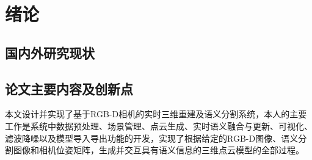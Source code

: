 
\chapter{绪论}



\section{国内外研究现状}






\section{论文主要内容及创新点}


\par 本文设计并实现了基于RGB-D相机的实时三维重建及语义分割系统，本人的主要工作是系统中数据预处理、场景管理、点云生成、实时语义融合与更新、可视化、滤波降噪以及模型导入导出功能的开发，实现了根据给定的RGB-D图像、语义分割图像和相机位姿矩阵，生成并交互具有语义信息的三维点云模型的全部过程。

